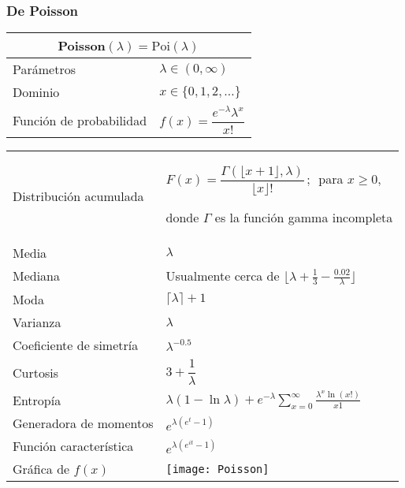 \documentclass[12pt,a4paper]{article}
\newcommand{\salto}[1][2]{\par\vspace{#1mm}}
\begin{document}
\subsubsection*{De Poisson}
\begin{center}
	\begin{tabular}{p{}|p{}}
	\multicolumn{2}{c}{Poisson$(\lambda) = \text{Poi}(\lambda)$} \\
	\hline
	Parámetros & $\lambda\in(0,\infty)$ \\
	Dominio & $x\in\{0,1,2,\ldots\}$ \\
	Función de probabilidad & $f(x) = \dfrac{e^{-\lambda}\lambda^x}{x!}$
	\end{tabular}
	\begin{tabular}{p{}|p{}}
	Distribución acumulada & $F(x) = \dfrac{\Gamma(\lfloor x + 1\rfloor, \lambda)}{\lfloor x\rfloor!}\,;\,$ para $x\geq 0$,\salto[2] donde $\Gamma$ es la función gamma incompleta \\
	Media & $\lambda$ \\
	Mediana & Usualmente cerca de $\lfloor\lambda + \frac{1}{3} - \frac{0.02}{\lambda}\rfloor$ \\
	Moda & $\lceil\lambda\rceil + 1$ \\
	Varianza & $\lambda$ \\
	Coeficiente de simetría & $\lambda^{-0.5}$ \\
	Curtosis & $3 + \dfrac{1}{\lambda}$ \\
	Entropía & $\displaystyle{\lambda(1 - \ln\lambda) + e^{-\lambda}\sum_{x = 0}^\infty\frac{\lambda^x\ln(x!)}{x1}}$ \\
	Generadora de momentos & $e^{\lambda(e^t - 1)}$ \\
	Función característica & $e^{\lambda(e^{it} - 1)}$ \\
	\vspace{0.25cm}Gráfica de $f(x)$ & \vspace{0.1mm}\texttt{[image: Poisson]}
	\end{tabular}
\end{center}
\end{document}
